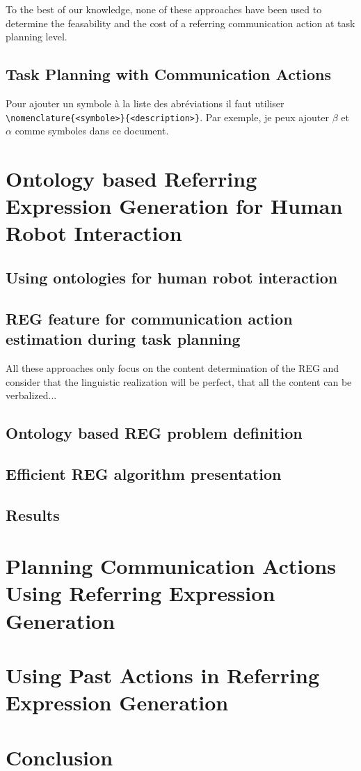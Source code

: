 \documentclass[a4paper,11pt,twoside]{StyleThese}
\begin{document}
To the best of our knowledge, none of these approaches have been used to determine the feasability and the cost of a referring communication action at task planning level.



\subsection{Task Planning with Communication Actions}

Pour ajouter un symbole à la liste des abréviations il faut utiliser
\verb|\nomenclature{<symbole>}{<description>}|. Par exemple, je peux ajouter
$\beta$ et
$\alpha$ comme
symboles dans ce document.

\section{Ontology based Referring Expression Generation for Human Robot Interaction}
\subsection{Using ontologies for human robot interaction}

\subsection{REG feature for communication action estimation during task planning}
All these approaches only focus on the content determination of the REG and consider that the linguistic realization will be perfect, that all the content can be verbalized...

\subsection{Ontology based REG problem definition}

\subsection{Efficient REG algorithm presentation}

\subsection{Results}

\section{Planning Communication Actions Using Referring Expression Generation}



\section{Using Past Actions in Referring Expression Generation}

\section{Conclusion}

\ifdefined{}
\else


\end{document}
